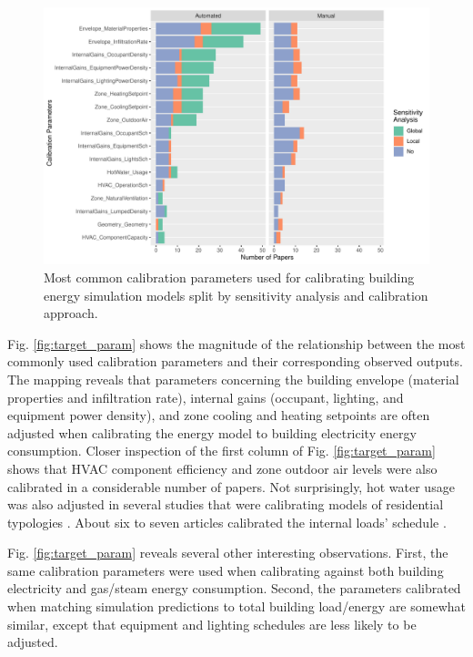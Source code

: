 \documentclass[review]{elsarticle}
\begin{document}
\begin{figure}[!h]
\centering
\includegraphics[width=\textwidth]{figures/param_rank.pdf}
\caption{Most common calibration parameters used for calibrating building energy simulation models split by sensitivity analysis and calibration approach.}
\label{fig:param}
\end{figure}


Fig. \ref{fig:target_param} shows the magnitude of the relationship between the most commonly used calibration parameters and their corresponding observed outputs. The mapping reveals that parameters concerning the building envelope (material properties and infiltration rate), internal gains (occupant, lighting, and equipment power density), and zone cooling and heating setpoints are often adjusted when calibrating the energy model to building electricity energy consumption. Closer inspection of the first column of Fig. \ref{fig:target_param} shows that HVAC component efficiency and zone outdoor air levels were also calibrated in a considerable number of papers. Not surprisingly, hot water usage was also adjusted in several studies that were calibrating models of residential typologies \cite{nagpal2019methodology, sokol2017validation, robertson2015reduced, manfren2020parametric}. About six to seven articles calibrated the internal loads' schedule \cite{nagpal2019methodology, kim2017building, sun2016pattern, nagpal2019framework, asadi2019building, chen2020automatic, krayem2019urban}. 

Fig. \ref{fig:target_param} reveals several other interesting observations. First, the same calibration parameters were used when calibrating against both building electricity and gas/steam energy consumption. Second, the parameters calibrated when matching simulation predictions to total building load/energy are somewhat similar, except that equipment and lighting schedules are less likely to be adjusted. 
\end{document}
